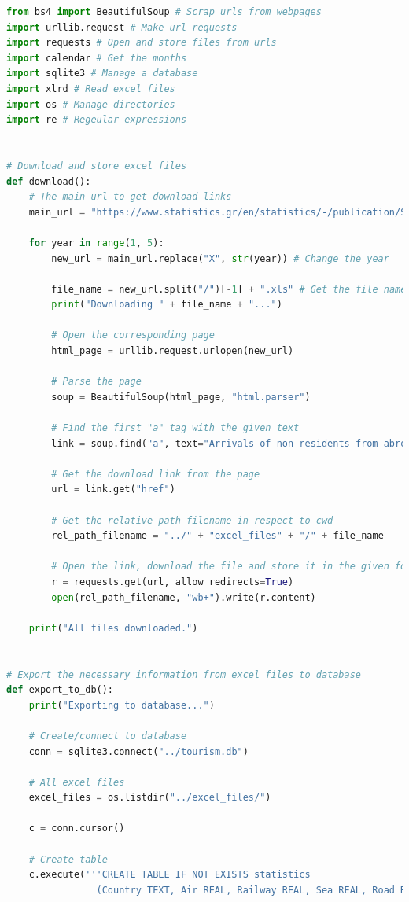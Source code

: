 \documentclass[a4paper]{article}
\begin{document}
\begin{lstlisting}[language=Python, caption=files.py]
from bs4 import BeautifulSoup # Scrap urls from webpages
import urllib.request # Make url requests
import requests # Open and store files from urls
import calendar # Get the months
import sqlite3 # Manage a database
import xlrd # Read excel files
import os # Manage directories
import re # Regeular expressions


# Download and store excel files
def download():
    # The main url to get download links
    main_url = "https://www.statistics.gr/en/statistics/-/publication/STO04/201X-Q4"

    for year in range(1, 5):
        new_url = main_url.replace("X", str(year)) # Change the year

        file_name = new_url.split("/")[-1] + ".xls" # Get the file name
        print("Downloading " + file_name + "...")
        
        # Open the corresponding page
        html_page = urllib.request.urlopen(new_url)

        # Parse the page
        soup = BeautifulSoup(html_page, "html.parser")

        # Find the first "a" tag with the given text
        link = soup.find("a", text="Arrivals of non-residents from abroad, by country of residence and by means of transport ")

        # Get the download link from the page
        url = link.get("href")

        # Get the relative path filename in respect to cwd
        rel_path_filename = "../" + "excel_files" + "/" + file_name

        # Open the link, download the file and store it in the given folder
        r = requests.get(url, allow_redirects=True)
        open(rel_path_filename, "wb+").write(r.content)

    print("All files downloaded.")


# Export the necessary information from excel files to database
def export_to_db():
    print("Exporting to database...")

    # Create/connect to database
    conn = sqlite3.connect("../tourism.db")

    # All excel files
    excel_files = os.listdir("../excel_files/")

    c = conn.cursor()

    # Create table
    c.execute('''CREATE TABLE IF NOT EXISTS statistics
                (Country TEXT, Air REAL, Railway REAL, Sea REAL, Road REAL, Month TEXT, Year INTEGER, unique(Country, Month, Year))''')


\end{lstlisting}
\end{document}
